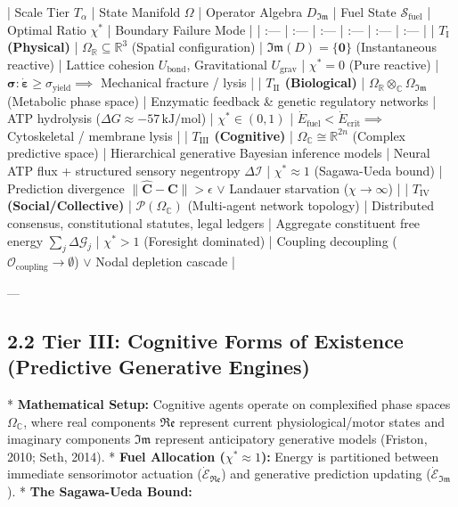 \documentclass[11pt,a4paper]{article}
\theoremstyle{definition}
\theoremstyle{remark}
\begin{document}
| Scale Tier $T_\alpha$ | State Manifold $\Omega$ | Operator Algebra $D_{\mathfrak{Im}}$ | Fuel State $\mathcal{S}_{\text{fuel}}$ | Optimal Ratio $\chi^*$ | Boundary Failure Mode |
| :--- | :--- | :--- | :--- | :--- | :--- |
| \textbf{$T_{\text{I}}$ (Physical)} | $\Omega_{\mathbb{R}} \subseteq \mathbb{R}^3$ (Spatial configuration) | $\mathfrak{Im}(D) = \{\mathbf{0}\}$ (Instantaneous reactive) | Lattice cohesion $U_{\text{bond}}$, Gravitational $U_{\text{grav}}$ | $\chi^* = 0$ (Pure reactive) | $\boldsymbol{\sigma}:\dot{\boldsymbol{\varepsilon}} \ge \sigma_{\text{yield}} \implies$ Mechanical fracture / lysis |
| \textbf{$T_{\text{II}}$ (Biological)} | $\Omega_{\mathbb{R}} \otimes_{\mathbb{C}} \Omega_{\mathfrak{Im}}$ (Metabolic phase space) | Enzymatic feedback \& genetic regulatory networks | ATP hydrolysis ($\Delta G \approx -57 \, \text{kJ/mol}$) | $\chi^* \in (0, 1)$ | $\dot{E}_{\text{fuel}} < \dot{E}_{\text{crit}} \implies$ Cytoskeletal / membrane lysis |
| \textbf{$T_{\text{III}}$ (Cognitive)} | $\Omega_{\mathbb{C}} \cong \mathbb{R}^{2n}$ (Complex predictive space) | Hierarchical generative Bayesian inference models | Neural ATP flux + structured sensory negentropy $\Delta \mathcal{I}$ | $\chi^* \approx 1$ (Sagawa-Ueda bound) | Prediction divergence $\|\hat{\mathbf{C}} - \mathbf{C}\| > \epsilon$ $\lor$ Landauer starvation ($\chi \to \infty$) |
| \textbf{$T_{\text{IV}}$ (Social/Collective)} | $\mathcal{P}(\Omega_{\mathbb{C}})$ (Multi-agent network topology) | Distributed consensus, constitutional statutes, legal ledgers | Aggregate constituent free energy $\sum_j \Delta \mathcal{G}_j$ | $\chi^* > 1$ (Foresight dominated) | Coupling decoupling ($\mathcal{O}_{\text{coupling}} \to \emptyset$) $\lor$ Nodal depletion cascade |

---

\subsection{2.2 Tier III: Cognitive Forms of Existence (Predictive Generative Engines)}
* \textbf{Mathematical Setup:} Cognitive agents operate on complexified phase spaces $\Omega_{\mathbb{C}}$, where real components $\mathfrak{Re}$ represent current physiological/motor states and imaginary components $\mathfrak{Im}$ represent anticipatory generative models (Friston, 2010; Seth, 2014).
* \textbf{Fuel Allocation ($\chi^* \approx 1$):} Energy is partitioned between immediate sensorimotor actuation ($\dot{\mathcal{E}}_{\mathfrak{Re}}$) and generative prediction updating ($\dot{\mathcal{E}}_{\mathfrak{Im}}$).
* \textbf{The Sagawa-Ueda Bound:}
  
\end{document}
